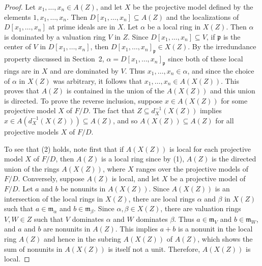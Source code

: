 \documentclass[preprint, 11pt,nonatbib]{elsarticle}
\theoremstyle{definition}
\numberwithin{theorem}{section}
\begin{document}
\begin{proof} 
Let $x_1,\ldots,x_n \in A(Z)$, and let $X$ be the projective model defined by the elements $1,x_1,\ldots,x_n$. Then $D[x_1,\ldots,x_n] \subseteq A(Z)$ and the localizations of $D[x_1,\ldots,x_n]$ at prime ideals are in $X$. 
Let $\alpha$ be a local ring in $X(Z)$.  Then $\alpha$ is dominated by a valuation ring $V$ in $Z$.  Since $D[x_1,\ldots,x_n] \subseteq V$, if ${\mathfrak{p}}$ is the center of $V$ in $D[x_1,\ldots,x_n]$, then $D[x_1,\ldots,x_n]_{\mathfrak{p}} \in X(Z)$. By the irredundance property discussed in Section~2, $\alpha = D[x_1,\ldots,x_n]_{\mathfrak{p}}$ since both of these local rings are in $X$ and are dominated by $V$. Thus $x_1,\ldots,x_n \in \alpha$, and since the choice of $\alpha$ in $X(Z)$ was arbitrary,  
  it follows that $x_1,\ldots,x_n \in A(X(Z))$. 
This proves that $A(Z)$ is contained in  the union of the $A(X(Z))$ and this union is directed. To prove the reverse inclusion, 
suppose $x \in A(X(Z))$ for some projective model $X$ of $F/D$. The fact that  $Z \subseteq d_X^{-1}(X(Z))$ implies
$x \in A(d_X^{-1}(X(Z))) \subseteq A(Z)$, and so $A(X(Z)) \subseteq A(Z)$ for all projective models $X$ of $F/D$. 

 

To see that (2) holds, note first that if  $A(X({Z}))$ is local for each projective model $X$ of $F/D$, then $A({Z})$ is a local ring since by (1), $A({Z})$ is the directed union of the rings $A(X({Z}))$, where $X$ ranges over the projective models of $F/D$.
Conversely, suppose $A(Z)$ is local, and let $X$ be a projective model of $F/D$. 
Let $a$ and $b$ be nonunits in $A(X({Z}))$. Since $A(X(Z))$ is an intersection of the  local rings in $X(Z)$, 
there are local rings $\alpha$ and $\beta$ in $X({Z})$ such that $a \in {\mathfrak{m}}_\alpha$ and $b \in {\mathfrak{m}}_\beta$. Since $\alpha,\beta \in X({Z})$, there are 
 valuation rings $V,W \in {Z}$ such that $V$ dominates $\alpha$ and $W$ dominates $\beta$.  Thus 
 $a \in {\mathfrak{m}}_V$ and $b \in {\mathfrak{m}}_W$, and  $a$ and $b$ are nonunits in $A(Z)$.  This implies  $a+b$ is a nonunit in the local ring $A(Z)$ and hence in the subring $A(X({Z}))$ of $A(Z)$, which shows the sum of nonunits in  $A(X({Z}))$ is itself not a unit. Therefore, $A(X({Z}))$ is local.  

 


\end{proof}
\end{document}
